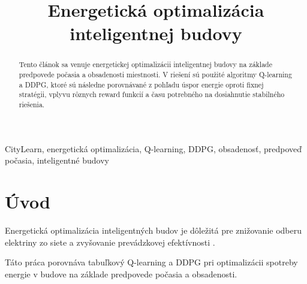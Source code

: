 \documentclass[conference]{IEEEtran}
\begin{document}
\title{Energetická optimalizácia inteligentnej budovy\\
}

\author{
\and
{}
}

\maketitle

\begin{abstract}

Tento článok sa venuje energetickej optimalizácii inteligentnej budovy na základe predpovede počasia a obsadenosti miestnosti. V riešení sú použité algoritmy Q-learning a DDPG, ktoré sú následne porovnávané z pohľadu úspor energie oproti fixnej stratégii, vplyvu rôznych reward funkcií a času potrebného na dosiahnutie stabilného riešenia.

\end{abstract}

\begin{IEEEkeywords}
    
CityLearn, energetická optimalizácia, Q-learning, DDPG, obsadenosť, predpoveď počasia, inteligentné budovy
\end{IEEEkeywords}

\section{Úvod}

Energetická optimalizácia inteligentných budov je dôležitá pre znižovanie odberu elektriny zo siete a zvyšovanie prevádzkovej efektívnosti \cite{b1}.

Táto práca porovnáva tabuľkový Q-learning a DDPG pri optimalizácii spotreby energie v budove na základe predpovede počasia a obsadenosti.
\end{document}

